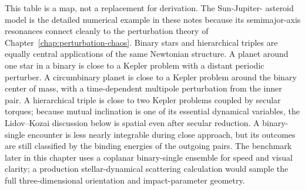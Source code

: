This table is a map, not a replacement for derivation.  The Sun-Jupiter-
asteroid model is the detailed numerical example in these notes because its
semimajor-axis resonances connect cleanly to the perturbation theory of
Chapter~\ref{chap:perturbation-chaos}.  Binary stars and hierarchical triples
are equally central applications of the same Newtonian structure.  A planet
around one star in a binary is close to a Kepler problem with a distant
periodic perturber.  A circumbinary planet is close to a Kepler problem around
the binary center of mass, with a time-dependent multipole perturbation from
the inner pair.  A hierarchical triple is close to two Kepler problems coupled
by secular torques; because mutual inclination is one of its essential
dynamical variables, the Lidov--Kozai discussion below is spatial even after
secular reduction.  A binary-single encounter is less nearly integrable during
close approach, but its outcomes are still classified by the binding energies
of the outgoing pairs.  The benchmark later in this chapter uses a coplanar
binary-single ensemble for speed and visual clarity; a production
stellar-dynamical scattering calculation would sample the full
three-dimensional orientation and impact-parameter geometry.

